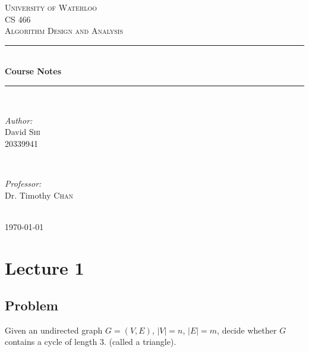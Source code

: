 \documentclass[english,12pt]{article}
\theoremstyle{plain}
\theoremstyle{definition}
\theoremstyle{definition} %
\begin{document}
\begin{titlepage}

\newcommand{\HRule}{\rule{\linewidth}{0.5mm}} %

\center %

\textsc{\LARGE University of Waterloo}\\[1.5cm] %
\textsc{\Large CS 466}\\[0.5cm] %
\textsc{\large Algorithm Design and Analysis}\\[0.5cm] %

\HRule \\[0.4cm]
{ \huge \bfseries Course Notes}\\[0.4cm] %
\HRule \\[1.5cm]

\begin{minipage}{0.4\textwidth}
\begin{flushleft} \large
\emph{Author:}\\
David \textsc{Shi}\\ %
20339941
\end{flushleft}
\end{minipage}
~
\begin{minipage}{0.4\textwidth}
\begin{flushright} \large
\emph{Professor:} \\
Dr. Timothy \textsc{Chan} %
\end{flushright}
\end{minipage}\\[4cm]

{\large \today}\\[3cm] %


\vfill %

\end{titlepage}


\newpage
\section{Lecture 1}
\subsection{Problem}
Given an undirected graph $G=(V,E)$, $|V|=n$, $|E|=m$, decide whether $G$ contains a cycle of length $3$.  (called a triangle).
\end{document}

